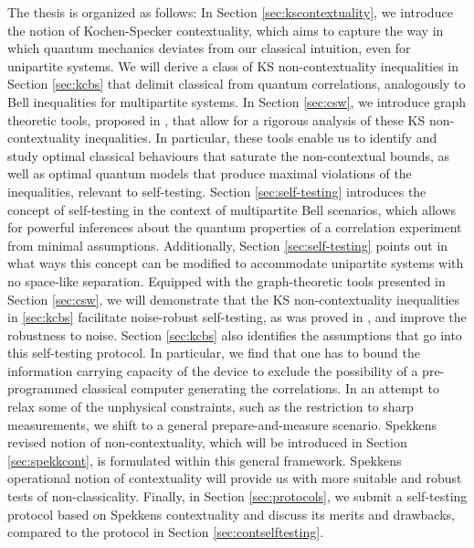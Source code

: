 The thesis is organized as follows:
In Section \ref{sec:kscontextuality}, we introduce the notion of Kochen-Specker contextuality, which aims to capture the way in which quantum mechanics deviates from our classical intuition, even for unipartite systems. We will derive a class of KS non-contextuality inequalities in Section \ref{sec:kcbs} that delimit classical from quantum correlations, analogously to Bell inequalities for multipartite systems. In Section \ref{sec:csw}, we introduce graph theoretic tools, proposed in \cite{Cabello2014}, that allow for a rigorous analysis of these KS non-contextuality inequalities. In particular, these tools enable us to identify and study optimal classical behaviours that saturate the non-contextual bounds, as well as optimal quantum models that produce maximal violations of the inequalities, relevant to self-testing. Section \ref{sec:self-testing} introduces the concept of self-testing in the context of multipartite Bell scenarios, which allows for powerful inferences about the quantum properties of a correlation experiment from minimal assumptions. Additionally, Section \ref{sec:self-testing} points out in what ways this concept can be modified to accommodate unipartite systems with no space-like separation. Equipped with the graph-theoretic tools presented in Section \ref{sec:csw}, we will demonstrate that the KS non-contextuality inequalities in \ref{sec:kcbs} facilitate noise-robust self-testing, as was proved in \cite{Bharti2019}, and improve the robustness to noise. Section \ref{sec:kcbs} also identifies the assumptions that go into this self-testing protocol. In particular, we find that one has to bound the information carrying capacity of the device to exclude the possibility of a pre-programmed classical computer generating the correlations. In an attempt to relax some of the unphysical constraints, such as the restriction to sharp measurements, we shift to a general prepare-and-measure scenario. Spekkens revised notion of non-contextuality, which will be introduced in Section \ref{sec:spekkcont}, is formulated within this general framework. Spekkens operational notion of contextuality will provide us with more suitable and robust tests of non-classicality.
Finally, in Section \ref{sec:protocols}, we submit a self-testing protocol based on Spekkens contextuality and discuss its merits and drawbacks, compared to the protocol in Section \ref{sec:contselftesting}.
